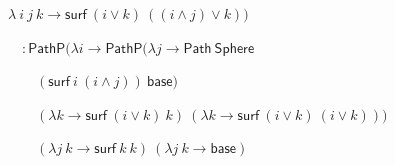 \documentclass[xetex, mathserif, serif]{beamer}
\newcommand{\cset}[1]{\ensuremath{\mathsf{{#1}}}}
\begin{document}
\begin{frame}
  \begin{exampleblock}{}
    $\lambda\ i\ j\ k \to \cset{surf}\ (i \vee k)\ ((i \wedge j) \vee k))$

    $\quad : \mathsf{PathP} (\lambda i \to \mathsf{PathP} (\lambda j \to
    \mathsf{Path}\ \mathsf{Sphere}$

    $\qquad (\cset{surf}\ i\ (i \wedge j))\ \cset{base})$

    $\qquad (\lambda k \to \cset{surf}\ (i \vee k)\ k)\ (\lambda k \to \cset{surf}\ (i \vee k)\ (i \vee k)))$

    $\qquad(\lambda j\ k \to \cset{surf}\ k\ k)\ (\lambda j\ k \to \cset{base})$

  \end{exampleblock}
\end{frame}
\end{document}
